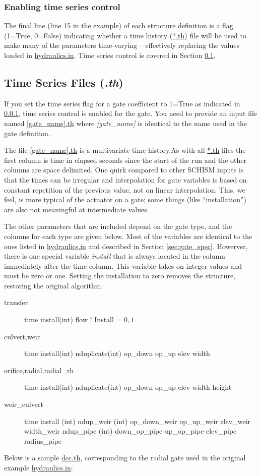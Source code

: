\subsubsection{Enabling time series control}
\label{sec:timeflag}
The final line (line 15 in the example) of each structure definition is a flag (1=True, 0=False) indicating whether a time history (\url{*.th}) file will be used to make many of the parameters time-varying -- effectively replacing the values loaded in 
\url{hydraulics.in}. Time series control is covered in Section \ref{sec:timeseries}.

\subsection{Time Series Files ({\em *.th})}
\label{sec:timeseries}
If you set the time series flag for a gate coefficient to 1=True as indicated in \ref{sec:timeflag}, time series control is
enabled for the gate. You need to provide an input file named \url{[gate_name].th} where {\em [gate\_name]} 
is identical to the name used in the gate definition.

The file \url{[gate_name].th} is a multivariate time history.As with all \url{*.th} files the first column  is time in elapsed seconds since the start of the run and the other columns are space delimited.
One quirk compared to other SCHISM inputs is that the times can be irregular and interpolation 
for gate variables is based on constant repetition of the previous value, not on linear interpolation. This, we feel, is more typical of the actuator on a gate; some things (like "`installation"') are
also not meaningful at intermediate values.

The other parameters that are included depend on the gate type, and the columns for each type are given below. 
Most of the variables are identical to the ones listed in \url{hydraulics.in} and described in
Section \ref{sec:gate_spec}. Howerver, there is one special variable {\em install} that is always 
located in the column immediately after the time column. This variable takes on integer values and must be zero or one. 
Setting the installation to zero removes the structure, restoring the original algorithm.
 
\begin{description}
\item[transfer] time  install(int) flow    ! Install = \(0,1\)
\item[culvert,weir] time install(int) nduplicate(int) op\_down op\_up elev width
\item[orifice,radial,radial\_rh] time install(int) nduplicate(int) op\_down op\_up elev width height
\item[weir\_culvert] time install (int) ndup\_weir (int) op\_down\_weir op\_up\_weir elev\_weir width\_weir ndup\_pipe (int) down\_op\_pipe up\_op\_pipe elev\_pipe radius\_pipe
\end{description}

Below is a sample \url{dcc.th}, corresponding to the radial gate used in the original example \url{hydraulics.in}:
\begin{samepage}

\end{samepage}


